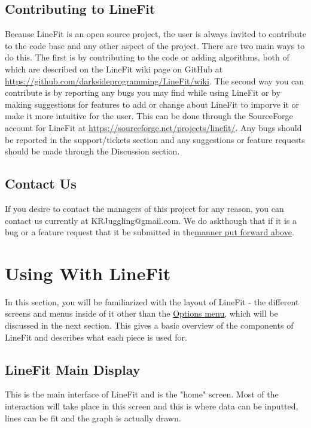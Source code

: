 \documentclass[titlepage,12pt]{article}
\begin{document}
\subsection{Contributing to LineFit}
\label{sec:contribute}

Because LineFit is an open source project, the user is always invited to contribute to the code base and any other aspect of the project. There are two main ways to do this. The first is by contributing to the code or adding algorithms, both of which are described on the LineFit wiki page on GitHub at \url{https://github.com/darksideprogramming/LineFit/wiki}. The second way you can contribute is by reporting any bugs you may find while using LineFit or by making suggestions for features to add or change about LineFit to imporve it or make it more intuitive for the user. This can be done through the SourceForge account for LineFit at \url{https://sourceforge.net/projects/linefit/}. Any bugs should be reported in the support/tickets section and any suggestions or feature requests should be made through the Discussion section.

\subsection{Contact Us}

If you desire to contact the managers of this project for any reason, you can contact us currently at KRJuggling@gmail.com. We do askthough that if it is a bug or a feature request that it be submitted in the\hyperref[sec:contribute]{manner put forward above}.

\section{Using With LineFit}
In this section, you will be familiarized with the layout of LineFit - the different screens and menus inside of it other than the \hyperref[sec:options]{Options menu}, which will be discussed in the next section. This gives a basic overview of the components of LineFit and describes what each piece is used for.



\subsection{LineFit Main Display}

This is the main interface of LineFit and is the "home" screen. Most of the interaction will take place in this screen and this is where data can be inputted, lines can be fit and the graph is actually drawn.
\end{document}
